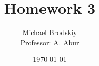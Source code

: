 


\title{Homework 3}
\date{\today}
\author{Michael Brodskiy\\ \small Professor: A. Abur}



\maketitle

